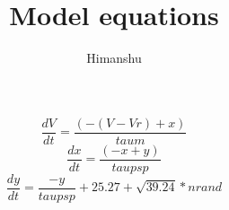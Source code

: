 \documentclass{article}
\title{Model equations}
\author{Himanshu}
\begin{document}
\maketitle
\begin{equation}
    \label{Voltage equation}
    \frac{dV}{dt} = \frac{(-(V-Vr)+x)}{taum}
\end{equation}
\begin{equation}
    \label{Conductance equation}
    \frac{dx}{dt} = \frac{(-x+y)}{taupsp}
\end{equation}
\begin{equation}
    \label{Synapse equation}
    \frac{dy}{dt} = \frac{-y}{taupsp} + 25.27 + \sqrt{39.24}*nrand
\end{equation}
\end{document}
